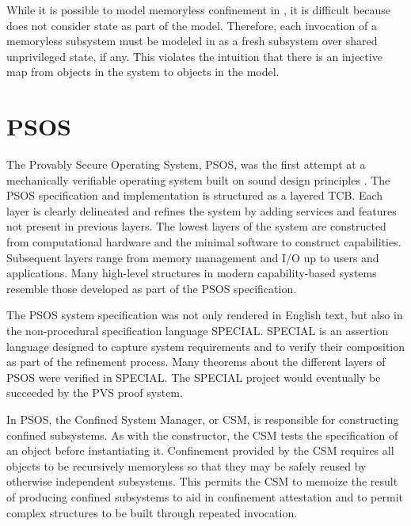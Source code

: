 While it is possible to model memoryless confinement in \TMmodelName{}, it is difficult because \TMmodelName{} does not consider state as part of the model.
Therefore, each invocation of a memoryless subsystem must be modeled in \TMmodelName{} as a fresh subsystem over shared unprivileged state, if any.
This violates the intuition that there is an injective map from objects in the system to objects in the model.

\section{PSOS}

The Provably Secure Operating System, PSOS, was the first attempt at a mechanically verifiable operating system built on sound design principles \cite{PSOS:TR}.
The PSOS specification and implementation is structured as a layered TCB.
Each layer is clearly delineated and refines the system by adding services and features not present in previous layers.
The lowest layers of the system are constructed from computational hardware and the minimal software to construct capabilities.
Subsequent layers range from memory management and I/O up to users and applications.
Many high-level structures in modern capability-based systems resemble those developed as part of the PSOS specification.

The PSOS system specification was not only rendered in English text, but also in the non-procedural specification language SPECIAL.
SPECIAL is an assertion language designed to capture system requirements and to verify their composition as part of the refinement process.
Many theorems about the different layers of PSOS were verified in SPECIAL.
The SPECIAL project would eventually be succeeded by the PVS \cite{cade92-pvs} proof system.

In PSOS, the Confined System Manager, or CSM, is responsible for constructing confined subsystems.
As with the constructor, the CSM tests the specification of an object before instantiating it.
Confinement provided by the CSM requires all objects to be recursively memoryless so that they may be safely reused by otherwise independent subsystems.
This permits the CSM to memoize the result of producing confined subsystems to aid in confinement attestation and to permit complex structures to be built through repeated invocation.

